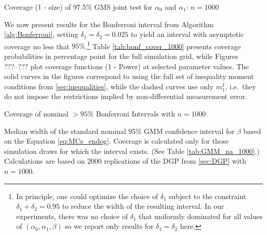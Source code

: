 \begin{table}
  \small
  \centering
  
  \caption{Coverage (1 - size) of 97.5\% GMS joint test for $\alpha_0$ and $\alpha_1$: $n = 1000$}
  \label{tab:alphas_cover_97point5_1000}
\end{table}

We now present results for the Bonferroni interval from Algorithm \ref{alg:Bonferroni}, setting $\delta_1 = \delta_2 = 0.025$ to yield an interval with asymptotic coverage no less that $95\%$.\footnote{In principle, one could optimize the choice of $\delta_1$ subject to the constraint $\delta_1 + \delta_2 = 0.95$ to reduce the width of the resulting interval. In our experiments, there was no choice of $\delta_1$ that uniformly dominated for all values of $(\alpha_0, \alpha_1, \beta)$ so we report only results for $\delta_1 = \delta_2$ here.}
Table \ref{tab:bonf_cover_1000} presents coverage probabilities in percentage point for the full simulation grid, while Figures ???--??? plot coverage functions (1 - Power) at selected parameter values.
The solid curves in the figures correspond to using the full set of inequality moment conditions from \ref{sec:inequalities}, while the dashed curves use only $m_{1}^I$, i.e.\ they do not impose the restrictions implied by non-differential measurement error.

\begin{table}[htbp]
  \centering
  
  \caption{Coverage of nominal $>95\%$ Bonferroni Intervals with $n = 1000$}
  \label{tab:bonf_cover_1000}
\end{table}

\begin{table}[htbp]
  \small
  \centering
  
  \caption{Median width of the standard nominal 95\% GMM confidence interval for $\beta$ based on the Equation \ref{eq:MCs_endog}. Coverage is calculated only for those simulation draws for which the interval exists. (See Table \ref{tab:GMM_na_1000}.) Calculations are based on 2000 replications of the DGP from \ref{sec:DGP} with $n = 1000$.} 
  \label{tab:GMM_width_1000}
\end{table}

